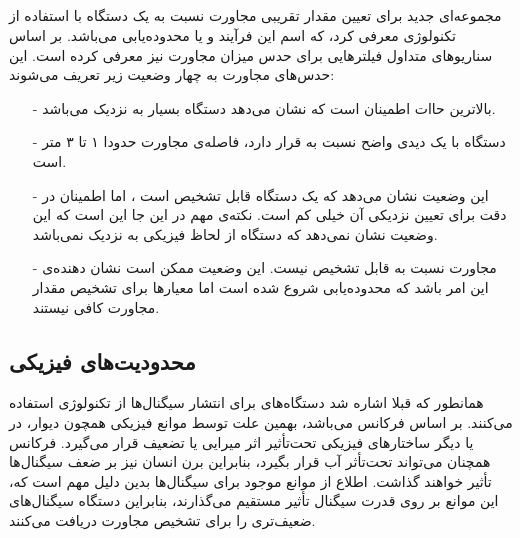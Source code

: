 \documentclass[oneside]{report}
\begin{document}
 \subsection{{\normalsize {}}}
  {\normalsize {}}
  مجموعه‌ای جدید برای تعیین مقدار تقریبی مجاورت نسبت به یک دستگاه با استفاده از تکنولوژی 
   {\normalsize {}}
   معرفی کرد، که اسم این فرآیند 
    {\normalsize {}}
    و یا محدوده‌یابی می‌باشد. 
    بر اساس سناریو‌های متداول 
     {\normalsize {}}
     فیلترهایی برای حدس میزان مجاورت نیز معرفی کرده است. این حدس‌های مجاورت به چهار وضعیت زیر تعریف می‌شوند:‌
     \begin{itemize}
     	\item[-]  {\normalsize {}}
     	بالاترین حاات اطمینان است که نشان می‌دهد دستگاه بسیار به 
     	 {\normalsize {}}
     	 نزدیک می‌باشد.
     	\item[-]  {\normalsize {}}
   دستگاه با یک دیدی واضح نسبت به 
    {\normalsize {}}
    قرار دارد، فاصله‌ی مجاورت حدودا ۱ تا ۳ متر است.  
     	\item[-] {\normalsize {}}
     	این وضعیت نشان می‌دهد که یک دستگاه
     	 {\normalsize {}}
     	 قابل تشخیص است ، اما اطمینان در دقت برای تعیین نزدیکی آن خیلی کم است. نکته‌ی مهم در این جا این است که این وضعیت نشان نمی‌دهد که دستگاه از لحاظ فیزیکی به 
     	  {\normalsize {}}
     	  نزدیک نمی‌باشد.  
     	\item[-] {\normalsize {}}
     	مجاورت نسبت به 
     	 {\normalsize {}}
     	 قابل تشخیص نیست. این وضعیت ممکن است نشان دهنده‌ی این امر باشد که محدوده‌یابی شروع شده است اما معیارها برای تشخیص مقدار مجاورت کافی نیستند. 
     \end{itemize}
    
    \subsection{محدودیت‌های فیزیکی}
  همانطور که قبلا اشاره شد  دستگاه‌های 
         	  {\normalsize {}}
         	  برای انتشار سیگنال‌ها از تکنولوژی
         	       	  {\normalsize {}}
     استفاده می‌کنند. 
          	  {\normalsize {}}
     بر اساس فرکانس 
          	  {\normalsize {}}
          	   می‌باشد، بهمین علت توسط موانع فیزیکی همچون دیوار، در یا دیگر ساختار‌های فیزیکی تحت‌تأثیر اثر میرایی یا تضعیف قرار می‌گیرد. فرکانس 
          	        	  {\normalsize {}} 
  همچنان می‌تواند تحت‌تأثر آب قرار بگیرد، بنابراین برن انسان نیز بر ضعف سیگنال‌ها تأثیر خواهند گذاشت. 
  اطلاع از موانع موجود برای سیگنال‌‌ها بدین دلیل مهم است که، این موانع بر روی قدرت سیگنال تأثیر مستقیم می‌گذارند، بنابراین دستگاه 
       	  {\normalsize {}}
       	  سیگنال‌های ضعیف‌تری را برای تشخیص مجاورت دریافت می‌کنند.        	        	     	       	  
    
\end{document}
